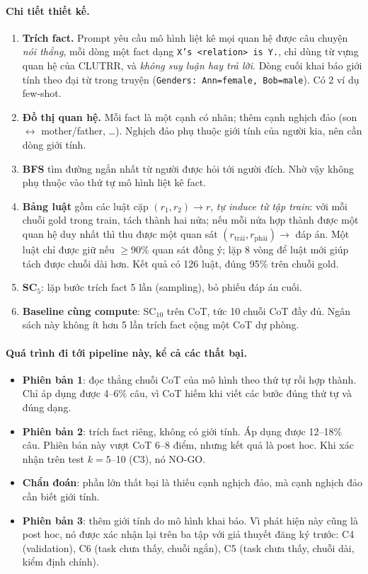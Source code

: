 \documentclass[11pt]{article}
\begin{document}
\paragraph{Chi tiết thiết kế.}
\begin{enumerate}[leftmargin=*,itemsep=2pt]
\item \textbf{Trích fact.} Prompt yêu cầu mô hình liệt kê mọi quan hệ được câu chuyện \emph{nói
  thẳng}, mỗi dòng một fact dạng \texttt{X's <relation> is Y.}, chỉ dùng từ vựng quan hệ của CLUTRR,
  và \emph{không suy luận hay trả lời}. Dòng cuối khai báo giới tính theo đại từ trong truyện
  (\texttt{Genders: Ann=female, Bob=male}). Có 2 ví dụ few-shot.
\item \textbf{Đồ thị quan hệ.} Mỗi fact là một cạnh có nhãn; thêm cạnh nghịch đảo (son $\leftrightarrow$
  mother/father, \dots). Nghịch đảo phụ thuộc giới tính của người kia, nên cần dòng giới tính.
\item \textbf{BFS} tìm đường ngắn nhất từ người được hỏi tới người đích. Nhờ vậy không phụ thuộc vào
  thứ tự mô hình liệt kê fact.
\item \textbf{Bảng luật} gồm các luật cặp $(r_1,r_2)\to r$, \emph{tự induce từ tập train}: với mỗi
  chuỗi gold trong train, tách thành hai nửa; nếu mỗi nửa hợp thành được một quan hệ duy nhất thì
  thu được một quan sát $(r_{\text{trái}},r_{\text{phải}})\to$ đáp án. Một luật chỉ được giữ nếu
  $\ge 90\%$ quan sát đồng ý; lặp 8 vòng để luật mới giúp tách được chuỗi dài hơn. Kết quả có 126
  luật, đúng 95\% trên chuỗi gold.
\item \textbf{SC$_5$}: lặp bước trích fact 5 lần (sampling), bỏ phiếu đáp án cuối.
\item \textbf{Baseline cùng compute}: SC$_{10}$ trên CoT, tức 10 chuỗi CoT đầy đủ. Ngân sách này
  không ít hơn 5 lần trích fact cộng một CoT dự phòng.
\end{enumerate}

\paragraph{Quá trình đi tới pipeline này, kể cả các thất bại.}
\begin{itemize}[leftmargin=*,itemsep=1pt]
\item \textbf{Phiên bản 1}: đọc thẳng chuỗi CoT của mô hình theo thứ tự rồi hợp thành. Chỉ áp dụng
  được 4--6\% câu, vì CoT hiếm khi viết các bước đúng thứ tự và đúng dạng.
\item \textbf{Phiên bản 2}: trích fact riêng, không có giới tính. Áp dụng được 12--18\% câu.
  Phiên bản này vượt CoT 6--8 điểm, nhưng kết quả là post hoc. Khi xác nhận trên test
  $k=5$--10 (C3), nó \textcolor{doxam}{NO-GO}.
\item \textbf{Chẩn đoán}: phần lớn thất bại là thiếu cạnh nghịch đảo, mà cạnh nghịch đảo cần biết
  giới tính.
\item \textbf{Phiên bản 3}: thêm giới tính do mô hình khai báo. Vì phát hiện này cũng là post hoc,
  nó được xác nhận lại trên ba tập với giả thuyết đăng ký trước: C4 (validation), C6 (task chưa
  thấy, chuỗi ngắn), C5 (task chưa thấy, chuỗi dài, kiểm định chính).
\end{itemize}
\end{document}
